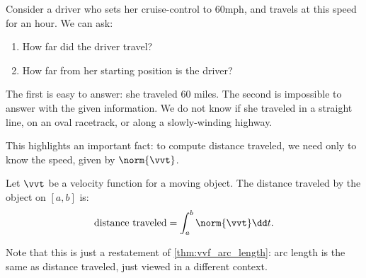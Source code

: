Consider a driver who sets her cruise-control to 60mph, and travels at this speed for an hour. We can ask:
\begin{enumerate}
	\item How far did the driver travel?
	\item	How far from her starting position is the driver?
\end{enumerate} 
The first is easy to answer: she traveled 60 miles. The second is impossible to answer with the given information. We do not know if she traveled in a straight line, on an oval racetrack, or along a slowly-winding highway.

This highlights an important fact: to compute distance traveled, we need only to know the speed, given by $\norm{\vvt}$.

\begin{theorem}\label{thm:distance_traveled}
Let $\vvt$ be a velocity function for a moving object. The distance traveled by the object on $[a,b]$ is:
\[\text{distance traveled} = \int_a^b \norm{\vvt}\dd t.\]
\end{theorem}

Note that this is just a restatement of \autoref{thm:vvf_arc_length}: arc length is the same as distance traveled, just viewed in a different context.


